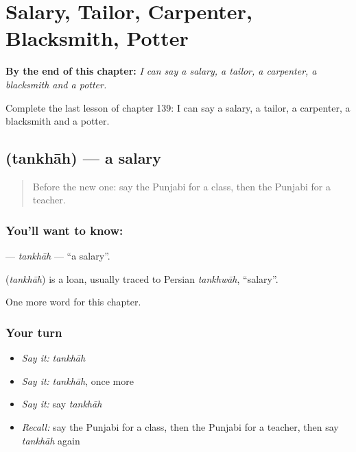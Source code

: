 
\chapter{Salary, Tailor, Carpenter, Blacksmith, Potter}
\label{ch:pa-salary-tailor-carpenter-blacksmith-potter}

\begin{chapteropening}
\textbf{By the end of this chapter:} \emph{I can say a salary, a tailor, a carpenter, a blacksmith and a potter.}

Complete the last lesson of chapter 139: I can say a salary, a tailor, a carpenter, a blacksmith and a potter.
\end{chapteropening}

\section[\texorpdfstring{\pa{ਤਨਖ਼ਾਹ} (tankhāh)}{ਤਨਖ਼ਾਹ (tankhāh)}]{ (tankhāh) — a salary}

\label{lesson:PA-C139-tankhah}



\begin{quote}
Before the new one: say the Punjabi for a class, then the Punjabi for a teacher.
\end{quote}

\subsection*{You'll want to know: }
\textbf{} — \emph{tankhāh} — \textquotedblleft{}a salary\textquotedblright{}.

\begin{cousinweb}
\textbf{} (\emph{tankhāh}) is a loan, usually traced to Persian \emph{tankhwāh}, \textquotedblleft{}salary\textquotedblright{}.
\end{cousinweb}

\begin{grammarlens}[title={What you've built}]
One more word for this chapter.
\end{grammarlens}

\subsection*{Your turn}
\begin{itemize}
\raggedright
  \item \emph{Say it:} \emph{tankhāh}
  \item \emph{Say it:} \emph{tankhāh}, once more
  \item \emph{Say it:} say \emph{tankhāh}
  \item \emph{Recall:} say the Punjabi for a class, then the Punjabi for a teacher, then say \emph{tankhāh} again
\end{itemize}

